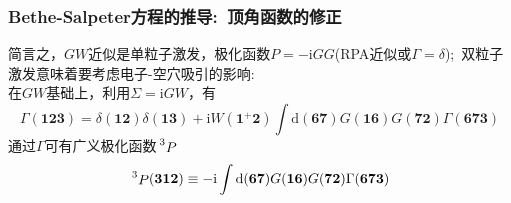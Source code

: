 \frame
{
	\frametitle{\textrm{Bethe-Salpeter}方程的推导:~顶角函数的修正}
	简言之，$GW$近似是单粒子激发，极化函数$P=-\mathrm{i}GG$(\textrm{RPA}近似或$\Gamma=\delta$);~双粒子激发意味着要考虑电子-空穴吸引的影响:\\
	在$GW$基础上，利用$\Sigma=\mathrm{i}GW$，有
	\begin{displaymath}
		\Gamma(\mathbf{123})=\delta(\mathbf{12})\delta(\mathbf{13})+\mathrm{i}W(\mathbf{1}^+\mathbf{2})\int \mathrm{d}(\mathbf{67})G(\mathbf{16})G(\mathbf{72})\Gamma(\mathbf{673})
	\end{displaymath}
	{\fontsize{8.0pt}{6.2pt}}
	通过$\Gamma$可有广义极化函数$\sideset{^3}{}{\mathop{P}}$
	\begin{displaymath}
		\sideset{^3}{}{\mathop{P}}(\mathbf{312})\equiv-\mathrm{i}\int\mathrm{d}(\mathbf{67})G(\mathbf{16})G(\mathbf{72})\Gamma(\mathbf{673})
	\end{displaymath}
}

